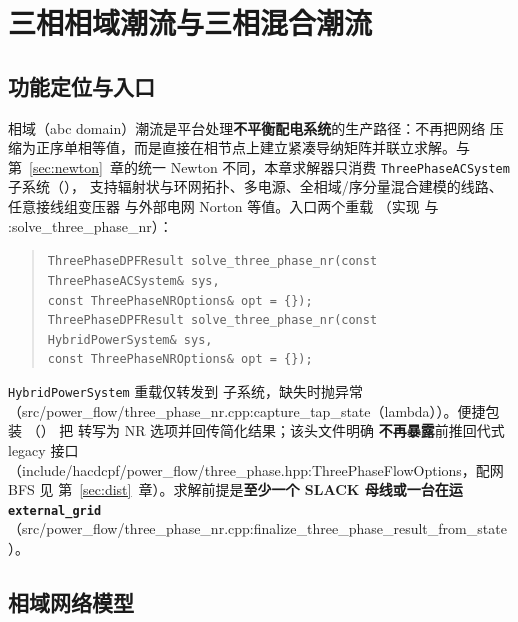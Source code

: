 \section{三相相域潮流与三相混合潮流}\label{sec:threephase}

\subsection{功能定位与入口}


相域（abc domain）潮流是平台处理\textbf{不平衡配电系统}的生产路径：不再把网络
压缩为正序单相等值，而是直接在相节点上建立紧凑导纳矩阵并联立求解。与
第~\ref{sec:newton}~章的统一 Newton 不同，本章求解器只消费
\texttt{ThreePhaseACSystem} 子系统（），
支持辐射状与环网拓扑、多电源、全相域/序分量混合建模的线路、任意接线组变压器
与外部电网 Norton 等值。入口两个重载
（实现  与 :solve\_three\_phase\_nr）：
\begin{quote}\footnotesize
\texttt{ThreePhaseDPFResult solve\_three\_phase\_nr(const ThreePhaseACSystem\& sys,\\
\hspace*{2em}const ThreePhaseNROptions\& opt = \{\});}\\
\texttt{ThreePhaseDPFResult solve\_three\_phase\_nr(const HybridPowerSystem\& sys,\\
\hspace*{2em}const ThreePhaseNROptions\& opt = \{\});}
\end{quote}
\texttt{HybridPowerSystem} 重载仅转发到  子系统，缺失时抛异常
（src/power\_flow/three\_phase\_nr.cpp:capture\_tap\_state（lambda））。便捷包装
（）
把  转写为 NR 选项并回传简化结果；该头文件明确
\textbf{不再暴露}前推回代式 legacy 接口（include/hacdcpf/power\_flow/three\_phase.hpp:ThreePhaseFlowOptions，配网 BFS 见
第~\ref{sec:dist}~章）。求解前提是\textbf{至少一个 SLACK 母线或一台在运
\texttt{external\_grid}}（src/power\_flow/three\_phase\_nr.cpp:finalize\_three\_phase\_result\_from\_state）。

\subsection{相域网络模型}

